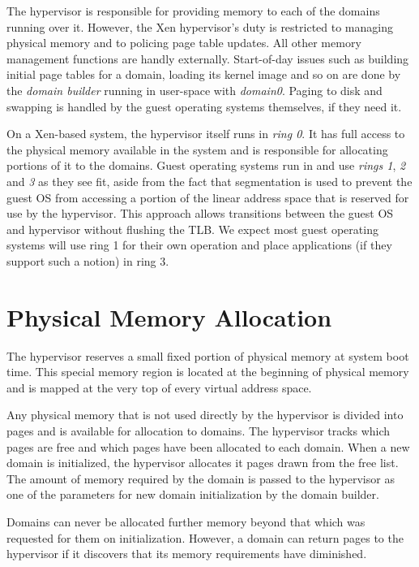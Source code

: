 \documentclass[11pt,twoside,final,openright]{xenstyle}
\begin{document}
The hypervisor is responsible for providing memory to each of the domains running 
over it. However, the Xen hypervisor's duty is restricted to managing physical
memory and to policing page table updates. All other memory management functions
are handly externally. Start-of-day issues such as building initial page tables
for a domain, loading its kernel image and so on are done by the {\it domain builder}
running in user-space with {\it domain0}. Paging to disk and swapping is handled
by the guest operating systems themselves, if they need it.

On a Xen-based system, the hypervisor itself runs in {\it ring 0}. It has full
access to the physical memory available in the system and is responsible for 
allocating portions of it to the domains. Guest operating systems run in and use
{\it rings 1}, {\it 2} and {\it 3} as they see fit, aside from the fact that
segmentation is used to prevent the guest OS from accessing a portion of the 
linear address space that is reserved for use by the hypervisor. This approach
allows transitions between the guest OS and hypervisor without flushing the TLB.
We expect most guest operating systems will use ring 1 for their own operation
and place applications (if they support such a notion) in ring 3.

\section{Physical Memory Allocation}
The hypervisor reserves a small fixed portion of physical memory at system boot
time. This special memory region is located at the beginning of physical memory
and is mapped at the very top of every virtual address space. 

Any physical memory that is not used directly by the hypervisor is divided into
pages and is available for allocation to domains. The hypervisor tracks which
pages are free and which pages have been allocated to each domain. When a new
domain is initialized, the hypervisor allocates it pages drawn from the free 
list. The amount of memory required by the domain is passed to the hypervisor
as one of the parameters for new domain initialization by the domain builder.

Domains can never be allocated further memory beyond that which was requested
for them on initialization. However, a domain can return pages to the hypervisor
if it discovers that its memory requirements have diminished.

\end{document}
